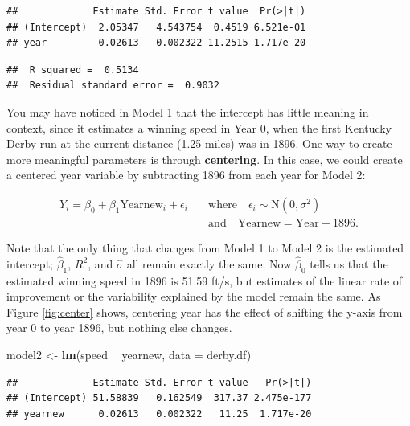 \documentclass[
]{krantz}
\newenvironment{Shaded}{\begin{snugshade}}{\end{snugshade}}
\newcommand{\DataTypeTok}[1]{\textcolor[rgb]{0.27,0.27,0.27}{#1}}
\newcommand{\KeywordTok}[1]{\textcolor[rgb]{0.27,0.27,0.27}{\textbf{#1}}}
\newcommand{\NormalTok}[1]{#1}
\newcommand{\OperatorTok}[1]{\textcolor[rgb]{0.43,0.43,0.43}{\textbf{#1}}}
\newcommand{\StringTok}[1]{\textcolor[rgb]{0.5,0.5,0.5}{#1}}
\begin{document}
\begin{verbatim}
##             Estimate Std. Error t value  Pr(>|t|)
## (Intercept)  2.05347   4.543754  0.4519 6.521e-01
## year         0.02613   0.002322 11.2515 1.717e-20
\end{verbatim}

\begin{verbatim}
##  R squared =  0.5134 
##  Residual standard error =  0.9032
\end{verbatim}

You may have noticed in Model 1 that the intercept has little meaning in context, since it estimates a winning speed in Year 0, when the first Kentucky Derby run at the current distance (1.25 miles) was in 1896. One way to create more meaningful parameters is through \textbf{centering}.  In this case, we could create a centered year variable by subtracting 1896 from each year for Model 2:

\begin{equation*}
\begin{split}
Y_{i}=\beta_{0}+\beta_{1}\textrm{Yearnew}_{i}+\epsilon_{i}\quad &\textrm{where} \quad \epsilon_{i}\sim \textrm{N}(0,\sigma^2) \\
    &\textrm{and} \quad \textrm{Yearnew}=\textrm{Year}-1896.
\end{split}
\end{equation*}

Note that the only thing that changes from Model 1 to Model 2 is the estimated intercept; \(\hat{\beta}_{1}\), \(R^2\), and \(\hat{\sigma}\) all remain exactly the same. Now \(\hat{\beta}_{0}\) tells us that the estimated winning speed in 1896 is 51.59 ft/s, but estimates of the linear rate of improvement or the variability explained by the model remain the same. As Figure \ref{fig:center} shows, centering year has the effect of shifting the y-axis from year 0 to year 1896, but nothing else changes.

\begin{Shaded}
\begin{Highlighting}[]
\NormalTok{model2 <-}\StringTok{ }\KeywordTok{lm}\NormalTok{(speed }\OperatorTok{~}\StringTok{ }\NormalTok{yearnew, }\DataTypeTok{data =}\NormalTok{ derby.df)}
\end{Highlighting}
\end{Shaded}

\begin{verbatim}
##             Estimate Std. Error t value   Pr(>|t|)
## (Intercept) 51.58839   0.162549  317.37 2.475e-177
## yearnew      0.02613   0.002322   11.25  1.717e-20
\end{verbatim}
\end{document}
